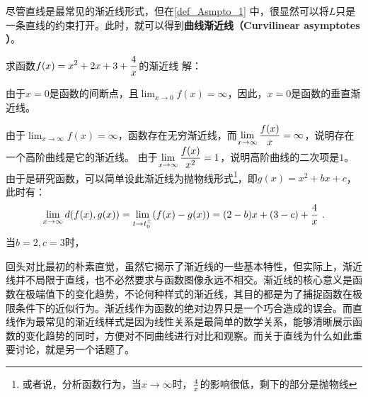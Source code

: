 尽管直线是最常见的渐近线形式，但在\autoref{def_Asmpto_1} 中，很显然可以将$L$只是一条直线的约束打开。此时，就可以得到\textbf{曲线渐近线（Curvilinear asymptotes ）}。

\begin{example}{求函数$\displaystyle f(x)=x^2+2x+3+{4\over x}$的渐近线}
解：

由于$x=0$是函数的间断点，且$\displaystyle\lim_{x\to0}f(x)=\infty$，因此，$x=0$是函数的垂直渐近线。

由于$\displaystyle\lim_{x\to\infty}f(x)=\infty$，函数存在无穷渐近线，而$\displaystyle\lim_{x\to\infty}{f(x)\over x}=\infty$，说明存在一个高阶曲线是它的渐近线。
由于$\displaystyle\lim_{x\to\infty}{f(x)\over x^2}=1$，说明高阶曲线的二次项是$1$。由于是研究函数，可以简单设此渐近线为抛物线形式\footnote{或者说，分析函数行为，当$x\to\infty$时，${4\over x}$的影响很低，剩下的部分是抛物线}，即$g(x)=x^2+bx+c$，此时有：
\begin{equation}
\displaystyle\lim_{x \to \infty} d(f(x), g(x)) =\displaystyle\lim_{t \to t^\pm_0} (f(x)-g(x))=(2-b)x+(3-c)+{4\over x}~.
\end{equation}
当$b=2,c=3$时，


\end{example}

回头对比最初的朴素直觉，虽然它揭示了渐近线的一些基本特性，但实际上，渐近线并不局限于直线，也不必然要求与函数图像永远不相交。渐近线的核心意义是函数在极端值下的变化趋势，不论何种样式的渐近线，其目的都是为了捕捉函数在极限条件下的近似行为。渐近线作为函数的绝对边界只是一个巧合造成的误会。而直线作为最常见的渐近线样式是因为线性关系是最简单的数学关系，能够清晰展示函数的变化趋势的同时，方便对不同曲线进行对比和观察。而关于直线为什么如此重要讨论，就是另一个话题了。